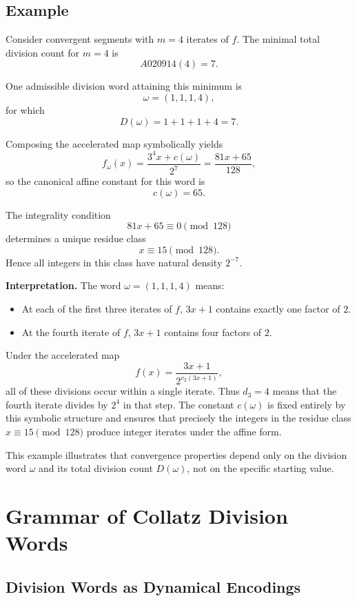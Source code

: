 \documentclass[12pt, oneside]{article}   	%
\numberwithin{equation}{section}          %
\theoremstyle{definition}
\begin{document}
\subsection{Example}

Consider convergent segments with $m=4$ iterates of $f$.  
The minimal total division count for $m=4$ is
\[
A020914(4) = 7.
\]

One admissible division word attaining this minimum is
\[
\omega = (1,1,1,4),
\]
for which
\[
D(\omega) = 1+1+1+4 = 7.
\]

Composing the accelerated map symbolically yields
\[
f_\omega(x)=\frac{3^4 x + c(\omega)}{2^7}
           = \frac{81x + 65}{128},
\]
so the canonical affine constant for this word is
\[
c(\omega)=65.
\]

The integrality condition
\[
81x + 65 \equiv 0 \pmod{128}
\]
determines a unique residue class
\[
x \equiv 15 \pmod{128}.
\]
Hence all integers in this class have natural density $2^{-7}$.

\medskip

\noindent
\textbf{Interpretation.}
The word $\omega = (1,1,1,4)$ means:

\begin{itemize}
    \item At each of the first three iterates of $f$, $3x+1$ contains exactly one factor of $2$.
    \item At the fourth iterate of $f$, $3x+1$ contains four factors of $2$.
\end{itemize}

Under the accelerated map
\[
f(x)=\frac{3x+1}{2^{v_2(3x+1)}},
\]
all of these divisions occur within a single iterate. Thus $d_3=4$ means that
the fourth iterate divides by $2^4$ in that step. The constant $c(\omega)$ is
fixed entirely by this symbolic structure and ensures that precisely the
integers in the residue class $x \equiv 15 \pmod{128}$ produce integer iterates
under the affine form.

\medskip

This example illustrates that convergence properties depend only on the division
word $\omega$ and its total division count $D(\omega)$, not on the specific
starting value.


\newpage
\section{Grammar of Collatz Division Words}
\label{sec:grammar}

\subsection{Division Words as Dynamical Encodings}
\end{document}
